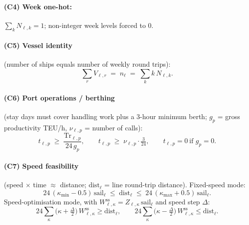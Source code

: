 \documentclass[11pt]{article}
\newcommand{\Tr}{\mathrm{Tr}}
\newcommand{\sail}{\mathrm{sail}}
\newcommand{\dist}{\mathrm{dist}}
\begin{document}
\paragraph{(C4) Week one-hot:} $\sum_k N_{\ell,k}=1$; non-integer week levels forced
to $0$.

\paragraph{(C5) Vessel identity} (number of ships equals number of weekly round trips):
\begin{equation}
  \sum_{r} V_{\ell,r} \;=\; n_\ell \;=\; \sum_k k\,N_{\ell,k}.
\end{equation}

\paragraph{(C6) Port operations / berthing} (stay days must cover handling work plus a
$3$-hour minimum berth; $g_p$ = gross productivity TEU/h, $\nu_{\ell,p}$ = number of
calls):
\begin{equation}
  t_{\ell,p} \;\ge\; \frac{\Tr_{\ell,p}}{24\,g_p},
  \qquad t_{\ell,p} \;\ge\; \nu_{\ell,p}\cdot \tfrac{3}{24},
  \qquad t_{\ell,p}=0 \ \text{if } g_p=0 .
\end{equation}

\paragraph{(C7) Speed feasibility} (speed $\times$ time $\approx$ distance;
$\dist_\ell$ = line round-trip distance). Fixed-speed mode:
\begin{equation}
  24\,(\kappa_{\min}-0.5)\,\sail_\ell \;\le\; \dist_\ell
  \;\le\; 24\,(\kappa_{\max}+0.5)\,\sail_\ell .
\end{equation}
Speed-optimisation mode, with $W^{\text{ss}}_{\ell,\kappa}=Z_{\ell,\kappa}\,\sail_\ell$
and speed step $\Delta$:
\begin{equation}
  24\sum_\kappa \big(\kappa+\tfrac{\Delta}{2}\big)\,W^{\text{ss}}_{\ell,\kappa} \ge \dist_\ell,
  \qquad
  24\sum_\kappa \big(\kappa-\tfrac{\Delta}{2}\big)\,W^{\text{ss}}_{\ell,\kappa} \le \dist_\ell .
\end{equation}
\end{document}
